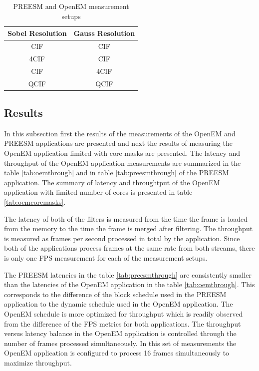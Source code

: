 \begin{table}
    \begin{center}
        \begin{tabular}{ c c }
            Sobel Resolution & Gauss Resolution \\ \hline
            CIF              & CIF              \\ \hline
            4CIF             & CIF              \\ \hline
            CIF              & 4CIF             \\ \hline
            QCIF             & QCIF             \\ \hline
        \end{tabular}
        \caption{PREESM and OpenEM measurement setups}
        \label{tab:preesm_setups}
    \end{center}
\end{table}

\subsection{Results}
In this subsection first the results of the measurements of the OpenEM and
PREESM applications are presented and next the results of measuring the OpenEM
application limited with core masks are presented. The latency and throughput of
the OpenEM application measurements are summarized in the table
\ref{tab:oemthrough} and in table \ref{tab:preesmthrough} of the PREESM
application. The summary of latency and throughtput of the OpenEM application
with limited number of cores is presented in table \ref{tab:oemcoremasks}.

The latency of both of the filters is measured from the time the frame is loaded
from the memory to the time the frame is merged after filtering. The throughput
is measured as frames per second processed in total by the application. Since
both of the applications process frames at the same rate from both streams,
there is only one FPS measurement for each of the measurement setups.

The PREESM latencies in the table \ref{tab:preesmthrough} are consistently
smaller than the latencies of the OpenEM application in the table
\ref{tab:oemthrough}. This corresponds to the difference of the block schedule
used in the PREESM application to the dynamic schedule used in the OpenEM
application. The OpenEM schedule is more optimized for throughput which is
readily observed from the difference of the FPS metrics for both applications.
The throughput versus latency balance in the OpenEM application is controlled
through the number of frames processed simultaneously. In this set of
measurements the OpenEM application is configured to process 16 frames
simultaneously to maximize throughput. \\

